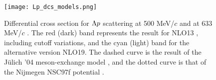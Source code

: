 \begin{figure}[h]
 \begin{center}
   \texttt{[image: Lp\_dcs\_models.png]}
   \caption{Differential cross section for $\Lambda p$ scattering at 500 MeV/$c$ and at 633 MeV/$c$ \cite{chiEFT-2020}. The red (dark) band represents the result for NLO13 \cite{chiEFT-2013}, including cutoff variations, and the cyan (light) band for the alternative version NLO19. The dashed curve is the result of the J\"{u}lich '04 meson-exchange model \cite{chiEFT-2005}, and the dotted curve is that of the Nijmegen NSC97f potential \cite{NSC97f}.} 
   \label{fig-Lp_dcs_models}
 \end{center}
\end{figure}


\clearpage
